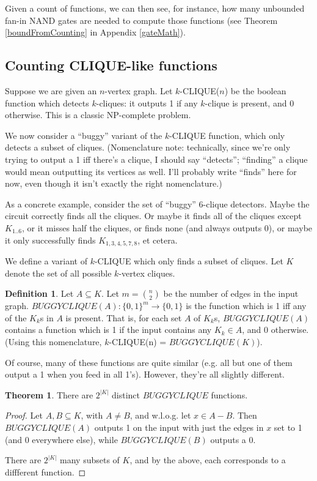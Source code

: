 \documentclass[12pt]{article}
\theoremstyle{definition}
\newtheorem{thm}{Theorem}[section]
\newtheorem{defn}{Definition}[section]
\begin{document}
Given a count of functions, we can then see, for instance,
how many unbounded fan-in NAND gates are needed to compute
those functions (see Theorem \ref{boundFromCounting}
in Appendix \ref{gateMath}).

\subsection{Counting CLIQUE-like functions}

Suppose we are given an $n$-vertex graph.
Let $k$-CLIQUE($n$) be the boolean function which
detects $k$-cliques: it outputs 1 if any $k$-clique
is present, and 0 otherwise. This is a classic
NP-complete problem.

We now consider a ``buggy'' variant of the $k$-CLIQUE function,
which only detects a subset of cliques. (Nomenclature note:
technically, since
we're only trying to output a 1 iff there's a clique, I should say
``detects''; ``finding'' a clique would mean outputting its
vertices as well. I'll probably write ``finds'' here for now,
even though it isn't exactly the right nomenclature.)

As a concrete example,
consider the set of ``buggy'' 6-clique detectors.
Maybe the circuit correctly
finds all the cliques. Or maybe it finds all of the cliques except $K_{1..6}$,
or it misses half the cliques, or finds none (and always outputs 0), or maybe
it only successfully finds $K_{1,3,4,5,7,8}$, et cetera.

We define a variant of $k$-CLIQUE which only
finds a subset of cliques.
Let $K$ denote the set of all possible
$k$-vertex cliques.

\begin{defn}
\label{BUGGYCLIQUE}
Let $A \subseteq K$.
Let $m = {n \choose 2}$ be the number of edges in the input graph.
$BUGGYCLIQUE(A): \{0,1\}^m \rightarrow \{0,1\}$ is the function which
is 1 iff any of the $K_k$s in $A$ is present.
That is, for each set $A$ of $K_k$s, $BUGGYCLIQUE(A)$
contains a function which is 1 if the input contains any $K_k \in A$,
and 0 otherwise. (Using this nomenclature,
$k$-CLIQUE(n) = $BUGGYCLIQUE(K)$).
\end{defn}

Of course, many of these functions are quite similar (e.g. all but one of them
output a 1 when you feed in all 1's). However, they're all slightly different.

\begin{thm}
\label{buggyDistinct}
There are  $2^{|K|}$ distinct $BUGGYCLIQUE$ functions.
\end{thm}
\begin{proof}

Let $A,B \subseteq K$, with $A \neq B$, and w.l.o.g.
let $x \in A-B$. Then $BUGGYCLIQUE(A)$ outputs 1 on the input
with just the edges in $x$ set to 1 (and 0 everywhere else),
while $BUGGYCLIQUE(B)$ outputs a 0.

There are $2^{|K|}$ many subsets of $K$,
and by the above, each corresponds to a diffferent function.
\end{proof}
\end{document}
